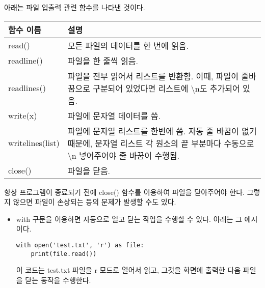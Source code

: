 아래는 파일 입출력 관련 함수를 나타낸 것이다.

\begin{longtable}[]{@{}p{4cm} p{10cm}@{}}
    \toprule
    함수 이름 & 설명 \\
    \midrule
    \endhead
    read() & 모든 파일의 데이터를 한 번에 읽음. \\
    readline() & 파일을 한 줄씩 읽음. \\
    readlines() & 파일을 전부 읽어서 리스트를 반환함. 이때, 파일이 줄바꿈으로 구분되어 있었다면 리스트에 \textbackslash n도 추가되어 있음. \\
    write(x) & 파일에 문자열 데이터를 씀. \\
    writelines(list) & 파일에 문자열 리스트를 한번에 씀. 자동 줄 바꿈이 없기 때문에, 문자열 리스트 각 원소의 끝 부분마다 수동으로 \textbackslash n 넣어주어야 줄 바꿈이 수행됨. \\
    close() & 파일을 닫음. \\
    \bottomrule
\end{longtable}

항상 프로그램이 종료되기 전에 close() 함수를 이용하여 파일을 닫아주어야 한다. 그렇지 않으면 파일이 손상되는 등의 문제가 발생할 수도 있다.

\begin{itemize}
    \item with 구문을 이용하면 자동으로 열고 닫는 작업을 수행할 수 있다. 아래는 그 예시이다.
\begin{tcolorbox}[colframe=black, colback=white]
\begin{verbatim}
with open('test.txt', 'r') as file:
    print(file.read())
\end{verbatim}
\end{tcolorbox}
    이 코드는 test.txt 파일을 r 모드로 열어서 읽고, 그것을 화면에 출력한 다음 파일을 닫는 동작을 수행한다.
\end{itemize}

